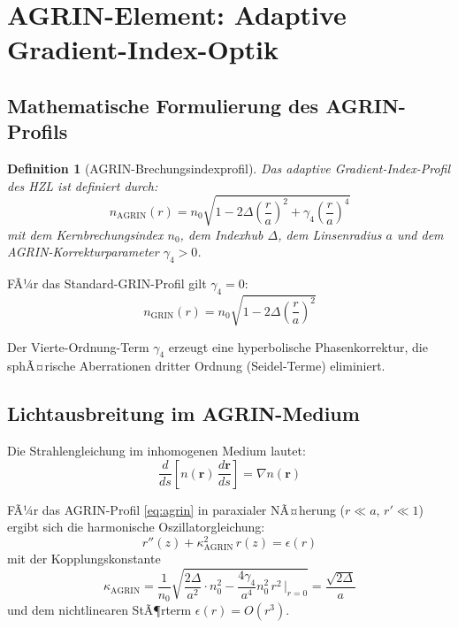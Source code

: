 ﻿\documentclass[12pt,a4paper]{article}
\newtheorem{definition}[theorem]{Definition}
\theoremstyle{definition}
\newcommand{\AGRIN}{\mathrm{AGRIN}}
\begin{document}
	\section{AGRIN-Element: Adaptive Gradient-Index-Optik}
	
	\subsection{Mathematische Formulierung des AGRIN-Profils}
	
	\begin{definition}[AGRIN-Brechungsindexprofil]
		Das adaptive Gradient-Index-Profil des HZL ist definiert durch:
		\begin{equation}
			n_\AGRIN(r) = n_0 \sqrt{1 - 2\Delta\!\left(\frac{r}{a}\right)^{\!2}
				+ \gamma_4\!\left(\frac{r}{a}\right)^{\!4}}
			\label{eq:agrin}
		\end{equation}
		mit dem Kernbrechungsindex $n_0$, dem Indexhub $\Delta$, dem Linsenradius $a$
		und dem AGRIN-Korrekturparameter $\gamma_4 > 0$.
	\end{definition}
	
	FÃ¼r das Standard-GRIN-Profil gilt $\gamma_4 = 0$:
	\begin{equation}
		n_\mathrm{GRIN}(r) = n_0 \sqrt{1 - 2\Delta\!\left(\frac{r}{a}\right)^{\!2}}
	\end{equation}
	
	Der Vierte-Ordnung-Term $\gamma_4$ erzeugt eine hyperbolische Phasenkorrektur,
	die sphÃ¤rische Aberrationen dritter Ordnung (Seidel-Terme) eliminiert.
	
	\subsection{Lichtausbreitung im AGRIN-Medium}
	
	Die Strahlengleichung im inhomogenen Medium lautet:
	\begin{equation}
		\frac{d}{ds}\!\left[n(\mathbf{r})\,\frac{d\mathbf{r}}{ds}\right]
		= \nabla n(\mathbf{r})
		\label{eq:ray_eikonal}
	\end{equation}
	
	FÃ¼r das AGRIN-Profil \eqref{eq:agrin} in paraxialer NÃ¤herung
	($r \ll a$, $r' \ll 1$) ergibt sich die harmonische Oszillatorgleichung:
	\begin{equation}
		r''(z) + \kappa_\AGRIN^2\, r(z) = \epsilon(r)
		\label{eq:agrin_ode}
	\end{equation}
	mit der Kopplungskonstante
	\begin{equation}
		\kappa_\AGRIN = \frac{1}{n_0}\sqrt{\frac{2\Delta}{a^2}\cdot n_0^2
			- \frac{4\gamma_4}{a^4}n_0^2\, r^2\,\bigg|_{r=0}}
		= \frac{\sqrt{2\Delta}}{a}
		\label{eq:kappa}
	\end{equation}
	und dem nichtlinearen StÃ¶rterm $\epsilon(r) = O(r^3)$.
	
\end{document}
